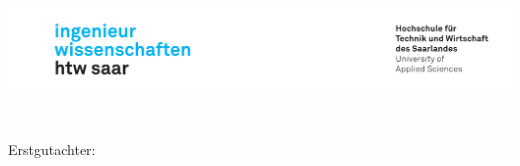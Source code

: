 \begin{titlepage}
\includegraphics[width=\linewidth]{Graphics/htwsaar_Logo_inwi_head_VF_4C_crop}
  \begin{center}
    \large  
    \hfill
    \vfill
    \begingroup
      \Large\bfseries\myTitle \\ \bigskip
    \endgroup

  \myDegree %

  \vfill
  \myName
  \vfill
  Erstgutachter: \myFirstProf \\

    \end{center}       
\end{titlepage}   